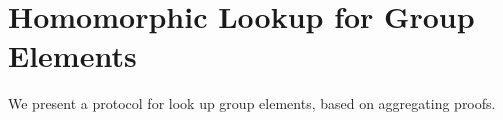 \section{Homomorphic Lookup for Group Elements}
We present a protocol for look up group elements, 
based on aggregating proofs.

